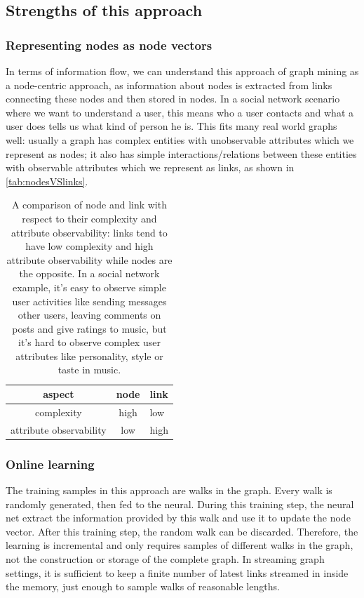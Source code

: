 \documentclass{article}
\begin{document}
\subsection{Strengths of this approach}

\subsubsection{Representing nodes as node vectors}
In terms of information flow, we can understand this approach of graph mining as a node-centric approach, as information about nodes is extracted from links connecting these nodes and then stored in nodes. In a social network scenario where we want to understand a user, this means who a user contacts and what a user does tells us what kind of person he is. This fits many real world graphs well: usually a graph has complex entities with unobservable attributes which we represent as nodes; it also has simple interactions/relations between these entities with observable attributes which we represent as links, as shown in \autoref{tab:nodesVSlinks}.

\begin{table}[h]
	\centering
	\begin{tabularx}{0.5\textwidth}{ |c|c|X| } \hline
		aspect  & node & link \\ \hline
		complexity & high & low \\ \hline
		attribute observability & low & high \\ \hline
	\end{tabularx}
	\caption{A comparison of node and link with respect to their complexity and attribute observability: links tend to have low complexity and high attribute observability while nodes are the opposite. In a social network example, it's easy to observe simple user activities like sending messages other users, leaving comments on posts and give ratings to music, but it's hard to observe complex user attributes like personality, style or taste in music.}
	\label{tab:nodesVSlinks}
\end{table}

\subsubsection{Online learning}
The training samples in this approach are walks in the graph. Every walk is randomly generated, then fed to the neural. During this training step, the neural net extract the information provided by this walk and use it to update the node vector. After this training step,  the random walk can be discarded. Therefore, the learning is incremental and only requires samples of different walks in the graph, not the construction or storage of the complete graph. In streaming graph settings, it is sufficient to keep a finite number of latest links streamed in inside the memory, just enough to sample walks of reasonable lengths.
\end{document}
